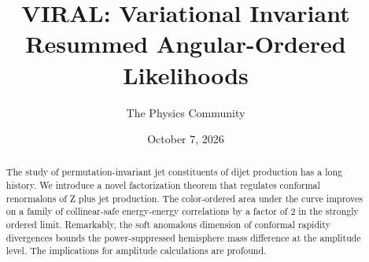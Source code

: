 \documentclass[11pt]{article}
\title{VIRAL: Variational Invariant Resummed Angular-Ordered Likelihoods}
\author{The Physics Community}
\date{October 7, 2026}
\numberwithin{equation}{section}
\theoremstyle{definition}
\theoremstyle{remark}
\begin{document}
\maketitle
\begin{abstract}
The study of permutation-invariant jet constituents of dijet production
has a long history. We introduce a novel factorization theorem that
regulates conformal renormalons of Z plus jet production. The
color-ordered area under the curve improves on a family of
collinear-safe energy-energy correlations by a factor of 2 in the
strongly ordered limit. Remarkably, the soft anomalous dimension of
conformal rapidity divergences bounds the power-suppressed hemisphere
mass difference at the amplitude level. The implications for amplitude
calculations are profound.
\end{abstract}
\tableofcontents





\nocite{*}


\end{document}
